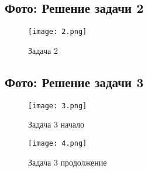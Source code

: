 \documentclass[areasetadvanced]{scrartcl}
\begin{document}
\subsection*{Фото: Решение задачи 2}
\begin{figure}[H]
    \centering
    \texttt{[image: 2.png]}
    \caption{Задача 2}
    \label{fig:syntdiag}
\end{figure}
\newpage
\subsection*{Фото: Решение задачи 3}
\begin{figure}[H]
    \centering
    \texttt{[image: 3.png]}
    \caption{Задача 3 начало}
    \label{fig:syntdiag}
\end{figure}
\newpage
\begin{figure}[H]
    \centering
    \texttt{[image: 4.png]}
    \caption{Задача 3 продолжение}
    \label{fig:syntdiag}
\end{figure}
\end{document}
